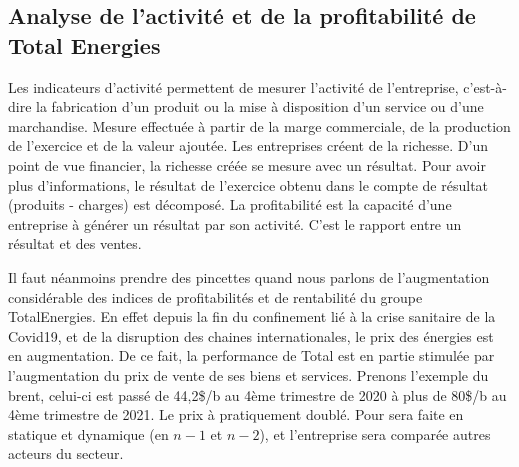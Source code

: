\documentclass[12pt]{article}
\begin{document}
\subsection{Analyse de l'activité et de la profitabilité de Total Energies}
Les indicateurs d'activité permettent de mesurer l'activité de l'entreprise, c'est-à-dire la fabrication d'un produit ou la mise à disposition d'un service ou d'une marchandise. Mesure 
effectuée à partir de la marge commerciale, de la production de l'exercice et de la valeur ajoutée.
Les entreprises créent de la richesse. D'un point de vue financier, la richesse créée se mesure avec un résultat. Pour avoir plus d'informations, le résultat de l'exercice obtenu dans
le compte de résultat (produits - charges) est décomposé. La profitabilité est la capacité d'une entreprise à générer un résultat par son activité. C'est le rapport entre un résultat
et des ventes.


Il faut néanmoins prendre des pincettes quand nous parlons de l'augmentation considérable des indices de profitabilités et de rentabilité du groupe TotalEnergies. En effet depuis la 
fin du confinement lié à la crise sanitaire de la Covid19, et de la disruption des chaines internationales, le prix des énergies est en augmentation. De ce 
fait, la performance de Total est en partie stimulée par l'augmentation du prix de vente de ses biens et services.
Prenons l'exemple du brent, celui-ci est passé de 44,2\$/b  au 4ème trimestre de 2020 à plus de 80\$/b au 4ème trimestre de 2021. Le prix à pratiquement doublé.
Pour sera faite en statique et dynamique (en $n-1$ et $n-2$), et l'entreprise sera comparée autres acteurs du secteur.
\end{document}
